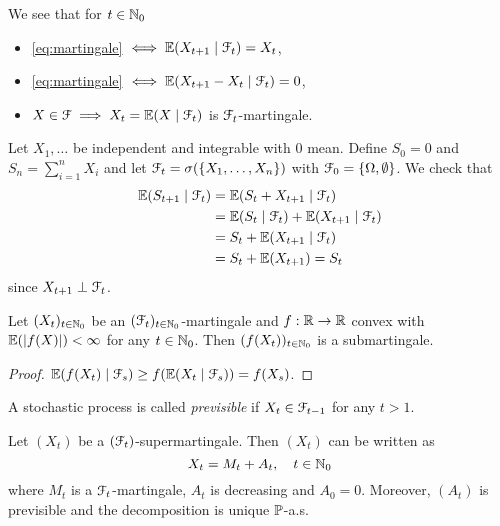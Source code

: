 \documentclass[12pt]{amsart}
\begin{document}
\begin{remark}
    We see that for \(t \in \N_0\)
    \begin{itemize}
        \item \eqref{eq:martingale} \(\iff \E(X_{t+1} \mid \cF_t) = X_t\),
        \item \eqref{eq:martingale} \(\iff \E(X_{t+1} - X_t \mid \cF_t) = 0\),
        \item \(X \in \cF \implies X_t = \E(X \mid \cF_t)\) is \(\cF_t\)-martingale.
    \end{itemize}
\end{remark}

\begin{example}
    Let \(X_1, \dots\) be independent and integrable with \(0\) mean. Define \(S_0 = 0\) and \(S_n = \sum_{i=1}^n X_i\) and let \(\cF_t = \sigma(\set{X_1, \dots, X_n})\) with \(\cF_0 = \set{\Omega, \emptyset}\). We check that
    \begin{align*}
        \E (S_{t+1} \mid \cF_t)
        &= \E(S_t+X_{t+1} \mid \cF_t)\\
        &= \E(S_t \mid \cF_t) + \E(X_{t+1} \mid \cF_t)\\
        &= S_t + \E(X_{t+1} \mid \cF_t)\\
        &= S_t + \E (X_{t+1}) = S_t
    \end{align*}
    since \(X_{t+1} \perp \cF_t\).
\end{example}

\begin{lemma}
    Let \((X_t)_{t \in \N_0}\) be an \((\cF_t)_{t \in \N_0}\)-martingale and \(f: \R \to \R\) convex with \(\E(\abs[f(X)]) < \infty\) for any \(t \in \N_0\). Then \((f(X_t))_{t \in \N_0}\) is a submartingale.
\end{lemma}
\begin{proof} \(\E(f(X_t) \mid \cF_s) \geq f(\E(X_t \mid \cF_s)) = f(X_s)\).
\end{proof}

\begin{definition}[Previsibility]
    A stochastic process is called \emph{previsible} if \(X_t \in \cF_{t-1}\) for any \(t > 1\).
\end{definition}

\begin{theorem}
    Let \((X_t)\) be a \((\cF_t)\)-supermartingale. Then \((X_t)\) can be written as \[
        X_t = M_t + A_t, \quad t \in \N_0
    \]
    where \(M_t\) is a \(\cF_t\)-martingale, \(A_t\) is decreasing and \(A_0=0\). Moreover, \((A_t)\) is previsible and the decomposition is unique \(\P\)-a.s.
\end{theorem}
\end{document}
